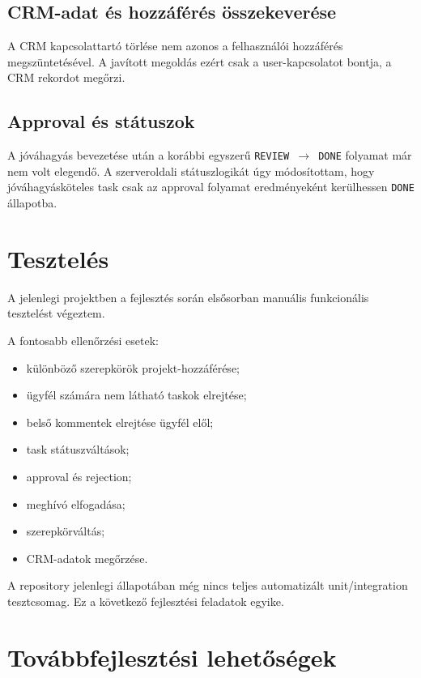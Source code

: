 \documentclass[11pt,a4paper]{report}
\begin{document}
    \section{CRM-adat és hozzáférés összekeverése}

    A CRM kapcsolattartó törlése nem azonos a felhasználói hozzáférés
    megszüntetésével. A javított megoldás ezért csak a user-kapcsolatot bontja,
    a CRM rekordot megőrzi.

    \section{Approval és státuszok}

    A jóváhagyás bevezetése után a korábbi egyszerű
    \texttt{REVIEW $\rightarrow$ DONE} folyamat már nem volt elegendő. A
    szerveroldali státuszlogikát úgy módosítottam, hogy jóváhagyásköteles task
    csak az approval folyamat eredményeként kerülhessen \texttt{DONE} állapotba.

    \chapter{Tesztelés}

    A jelenlegi projektben a fejlesztés során elsősorban manuális funkcionális
    tesztelést végeztem.

    A fontosabb ellenőrzési esetek:
    \begin{itemize}
        \item különböző szerepkörök projekt-hozzáférése;
        \item ügyfél számára nem látható taskok elrejtése;
        \item belső kommentek elrejtése ügyfél elől;
        \item task státuszváltások;
        \item approval és rejection;
        \item meghívó elfogadása;
        \item szerepkörváltás;
        \item CRM-adatok megőrzése.
    \end{itemize}

    A repository jelenlegi állapotában még nincs teljes automatizált
    unit/integration tesztcsomag. Ez a következő fejlesztési feladatok egyike.

    \chapter{Továbbfejlesztési lehetőségek}
\end{document}

